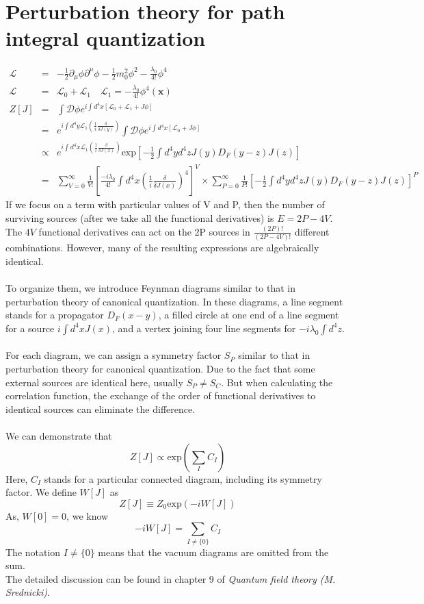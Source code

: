 \documentclass[cyan]{elegantnote}
\begin{document}
\section{Perturbation theory for path integral quantization}
\begin{eqnarray}
\mathcal{L} &=& -\frac{1}{2}\partial_{\mu} \phi \partial^{\mu} \phi -\frac{1}{2}m_0^2 \phi^2 -\frac{\lambda_0}{4!}\phi^4 \nonumber \\
\mathcal{L} &=& \mathcal{L}_0 + \mathcal{L}_1 \quad \mathcal{L}_1 =- \frac{\lambda_0}{4!} \phi^4 (\bm{x}) \nonumber \\
Z[J] &=& \int \mathcal{D}\phi e^{i\int d^4x [\mathcal{L}_0 + \mathcal{L}_1 + J\phi]} \nonumber \\
&=& e^{i\int d^4y \mathcal{L}_1(\frac{1}{i} \frac{\delta}{\delta J(y)})} \int \mathcal{D}\phi e^{i\int d^4x [\mathcal{L}_0 + J\phi]} \nonumber \\
&\propto & e^{i\int d^4x \mathcal{L}_1(\frac{1}{i} \frac{\delta}{\delta J(x)})} \mathrm{exp} [-\frac{1}{2} \int d^4y d^4z J(y)D_F(y-z)J(z)] \nonumber \\
& =& \sum_{V=0}^{\infty} \frac{1}{V!} [ \frac{-i\lambda_0}{4!} \int d^4x (\frac{1}{i} \frac{\delta}{\delta J(x)})^4]^V \times \sum_{P=0}^{\infty} \frac{1}{P!} [-\frac{1}{2} \int d^4y d^4z J(y)D_F(y-z)J(z)]^P \nonumber
\end{eqnarray}
If we focus on a term with particular values of V and P, then
the number of surviving sources (after we take all the functional derivatives) is $E = 2P-4V$. The $4V$ functional derivatives can act on the 2P sources in $\frac{(2P)!}{(2P-4V)!}$ different combinations. However, many of the resulting expressions are algebraically identical.\\ \\
To organize them, we introduce Feynman diagrams similar to that in perturbation theory of canonical quantization. In these diagrams, a line segment stands for a propagator $D_F(x-y)$, a filled circle at one end of a line segment for a source $i\int d^4x J(x)$, and a vertex joining four line segments for $-i\lambda_0 \int d^4 z$.\\ \\
For each diagram, we can assign a symmetry factor $S_P$ similar to that in perturbation theory for canonical quantization. Due to the fact that some external sources are identical here, usually $S_P \neq S_C$. But when calculating the correlation function, the exchange of the order of functional derivatives to identical sources can eliminate the difference.\\ \\
We can demonstrate that
\[Z[J] \propto \mathrm{exp}(\sum_I C_I)\]
Here, $C_I$ stands for a particular connected diagram, including its symmetry factor. We define $W[J]$ as
\[Z[J] \equiv Z_0 \mathrm{exp}(-iW[J])\]
As, $W[0]=0$, we know
\[-iW[J] = \sum_{I \neq \{0\}} C_I\]
The notation $I\neq \{0\}$ means that the vacuum diagrams are omitted from the sum.\\
The detailed discussion can be found in chapter 9 of \emph{Quantum field theory (M. Srednicki)}.
\end{document}
